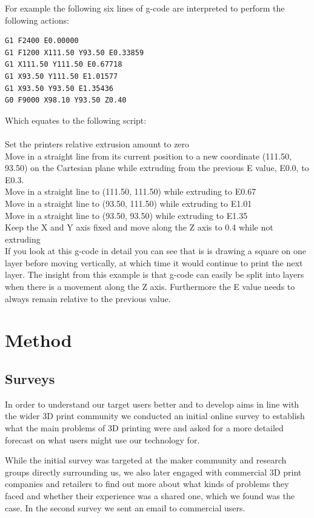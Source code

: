 \documentclass[11pt]{report} %
\begin{document}
For example the following six lines of g-code are interpreted to perform the following actions:
\begin{verbatim}
G1 F2400 E0.00000
G1 F1200 X111.50 Y93.50 E0.33859
G1 X111.50 Y111.50 E0.67718
G1 X93.50 Y111.50 E1.01577
G1 X93.50 Y93.50 E1.35436
G0 F9000 X98.10 Y93.50 Z0.40
\end{verbatim}

Which equates to the following script:\\
\\
Set the printers relative extrusion amount to zero\\
Move in a straight line from its current position to a new coordinate (111.50, 93.50) on the Cartesian plane while extruding from the previous E value, E0.0,  to E0.3.\\
Move in a straight line to (111.50, 111.50) while extruding to E0.67\\
Move in a straight line to (93.50, 111.50) while extruding to E1.01\\
Move in a straight line to (93.50, 93.50) while extruding to E1.35\\
Keep the X and Y axis fixed and move along the Z axis to 0.4 while not extruding\\

If you look at this g-code in detail you can see that is is drawing a square on one layer before moving vertically, at which time it would continue to print the next layer. The insight from this example is that g-code can easily be split into layers when there is a movement along the Z axis. Furthermore the E value needs to always remain relative to the previous value. 




\chapter{Method}
\section{Surveys}
In order to understand our target users better and to develop aims in line with the wider 3D print community we conducted an initial online survey to establish what the main problems of 3D printing were and asked for a more detailed forecast on what users might use our technology for. 

While the initial survey was targeted at the maker community and research groups directly surrounding us, we also later engaged with commercial 3D print companies and retailers to find out more about what kinds of problems they faced and whether their experience was a shared one, which we found was the case. In the second survey we sent an email to commercial users. 
\end{document}
